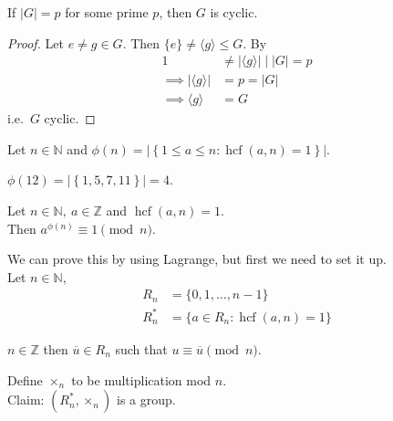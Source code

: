 \begin{corollary}
\protect\hypertarget{cor:three}{}\label{cor:three}
If \(|G| = p\) for some prime \(p\), then \(G\) is cyclic.
\end{corollary}

\begin{proof}
Let \(e \neq g \in G\).
Then \(\{ e \} \neq \langle g \rangle \leq G\).
By 
\begin{align*}
    1 &\neq | \langle g \rangle | \;\bigg|\; |G| = p \\
    \implies | \langle g \rangle | &= p = |G| \\
    \implies \langle g \rangle &= G
\end{align*}
i.e.~\(G\) cyclic.
\end{proof}

\begin{definition}
    Let \(n \in \mathbb{N}\) and \(\phi(n) = \left| \left\{ 1 \leq a \leq n : \operatorname{hcf}(a, n) = 1 \right\} \right|\). 
\end{definition} 

\begin{example}
    \(\phi(12) = \left| \left\{ 1, 5, 7, 11 \right\} \right| = 4\).
\end{example} 

\begin{theorem}
\protect\hypertarget{thm:four}{}\label{thm:four}Let \(n \in \mathbb{N},\ a \in \mathbb{Z}\) and \(\operatorname{hcf}(a, n) = 1\).\\
Then \(a^{\phi(n)} \equiv 1 \pmod n\).
\end{theorem}

We can prove this by using Lagrange, but first we need to set it up.\\
Let \(n \in \mathbb{N}\),
\begin{align*}
    R_n &= \{ 0, 1, \ldots, n-1 \} \\
    R_n^* &= \{ a \in R_n : \operatorname{hcf}(a, n) = 1 \}
\end{align*}

\begin{notation}
    \(n \in \mathbb{Z}\) then \(\overline{u} \in R_n\) such that \(u \equiv \overline{u} \pmod n\).
\end{notation} 

Define \(\times_n\) to be multiplication mod \(n\).\\
Claim: \((R_n^*, \times_n)\) is a group.


